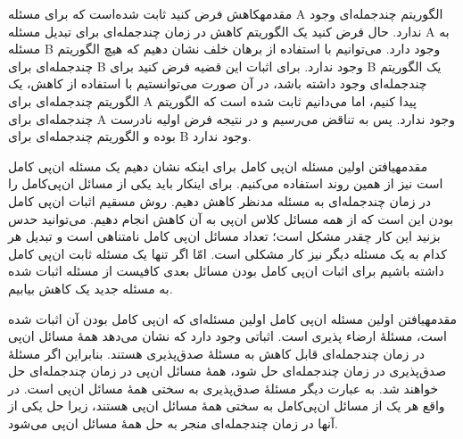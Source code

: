 

\begin{itemframe-s}{مقدمه}{کاهش}
\itm
فرض کنید ثابت شده‌است که برای مسئله A الگوریتم چندجمله‌ای وجود ندارد. حال فرض کنید یک الگوریتم کاهش در زمان چندجمله‌ای برای تبدیل مسئله A به مسئله B وجود دارد. می‌توانیم با استفاده از برهان خلف نشان دهیم که هیچ الگوریتم چندجمله‌ای برای B وجود ندارد.
\itm
برای اثبات این قضیه فرض کنید برای B یک الگوریتم چندجمله‌ای وجود داشته باشد، در آن صورت می‌توانستیم با استفاده از کاهش، یک الگوریتم چندجمله‌ای برای A پیدا کنیم، اما می‌دانیم ثابت شده است که الگوریتم چندجمله‌ای برای A وجود ندارد. پس به تناقض می‌رسیم و در نتیجه فرض اولیه نادرست بوده و الگوریتم چندجمله‌ای برای ‌B وجود ندارد.
\end{itemframe-s}

\begin{itemframe-s}{مقدمه}{یافتن اولین مسئله ان‌پی کامل}
\itm
برای اینکه نشان دهیم یک مسئله ان‌پی کامل است نیز از همین روند استفاده می‌کنیم. برای اینکار باید یکی از مسائل ان‌پی‌کامل را در زمان چندجمله‌ای به مسئله مدنظر کاهش دهیم.
\itm
روش مسقیم اثبات ان‌پی کامل بودن این است که از همه مسائل کلاس ان‌پی به آن کاهش انجام دهیم. می‌توانید حدس بزنید این کار چقدر مشکل است؛ تعداد مسائل ان‌پی کامل نامتناهی است و تبدیل هر کدام به یک مسئله دیگر نیز کار مشکلی است.
\itm
امّا اگر تنها یک مسئله ثابت ان‌پی کامل داشته باشیم برای اثبات ان‌پی کامل بودن مسائل بعدی کافیست از مسئله اثبات شده به مسئله جدید یک کاهش بیابیم.
\end{itemframe-s}


\begin{itemframe-s}{مقدمه}{یافتن اولین مسئله ان‌پی کامل}
\itm
اولین مسئله‌ای که ان‌پی کامل بودن آن اثبات شده است، مسئلهٔ ارضاء پذیری است.
اثباتی وجود دارد که نشان می‌دهد همهٔ مسائل ان‌پی در زمان چندجمله‌ای قابل کاهش به مسئلهٔ صدق‌پذیری هستند.
بنابراین اگر مسئلهٔ صدق‌پذیری در زمان چندجمله‌ای حل شود، همهٔ مسائل ان‌پی در زمان چندجمله‌ای حل خواهند شد. به عبارت دیگر مسئلهٔ صدق‌پذیری به سختی همهٔ مسائل ان‌پی است.
\itm
در واقع هر یک از مسائل ان‌پی‌کامل به سختی همهٔ مسائل ان‌پی هستند، زیرا حل یکی از آنها در زمان چندجمله‌ای منجر به حل همهٔ مسائل ان‌پی می‌شود.
\end{itemframe-s}
